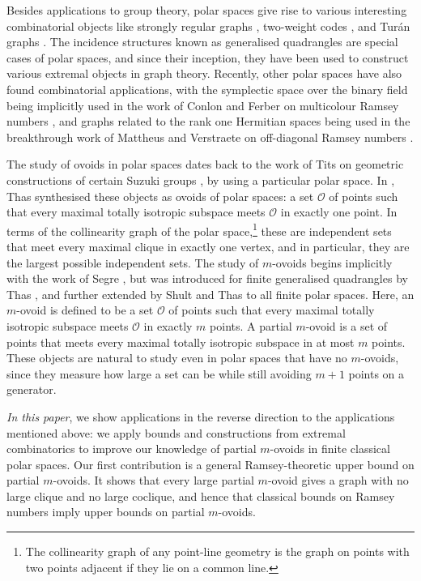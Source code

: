 \documentclass[a4paper,11pt]{amsproc}
\theoremstyle{plain}
\theoremstyle{definition}
\newcommand{\<}{\langle}
\renewcommand{\>}{\rangle} %
\begin{document}
Besides applications to group theory, polar spaces give rise to various interesting combinatorial objects like strongly regular graphs \cite{BvM}, two-weight codes \cite{CK86}, and Tur\'{a}n graphs \cite{Ball-Pepe}. 
The incidence structures known as generalised quadrangles are special cases of polar spaces, and since their inception, they have been used to construct various extremal objects in graph theory.
Recently, other polar spaces have also found combinatorial applications, with the symplectic space over the binary field being implicitly used in the work of Conlon and Ferber on multicolour Ramsey numbers \cite{CF21}, and graphs related to the rank one Hermitian spaces being used in the breakthrough work of Mattheus and Verstraete on off-diagonal Ramsey numbers \cite{MV23}. 

The study of ovoids in polar spaces dates back to the work of Tits on geometric constructions of certain Suzuki groups \cite{ThasHvM,Tits62,Tits62Suzuki}, by using a particular polar space. 
In \cite{Thas81}, Thas synthesised these objects as ovoids of polar spaces: a set $\mathcal{O}$ of points such that every maximal totally isotropic subspace meets $\mathcal{O}$ in exactly one point. 
In terms of the collinearity graph of the polar space,\footnote{The collinearity graph of any point-line geometry is the graph on points with two points adjacent if they lie on a common line.} these are independent sets that meet every maximal clique in exactly one vertex, and in particular, they are the largest possible independent sets. 
The study of $m$-ovoids begins implicitly with the work of Segre \cite{Segre65}, but was introduced for finite generalised quadrangles by Thas \cite{Thas:Interesting}, and further extended by Shult and Thas \cite{ST1996} to all finite polar spaces. 
Here, an $m$-ovoid is defined to be a set $\mathcal{O}$ of points such that every maximal totally isotropic subspace meets $\mathcal{O}$ in exactly $m$ points. 
A partial $m$-ovoid is a set of points that meets every maximal totally isotropic subspace in at most $m$ points. 
These objects are natural to study even in polar spaces that have no $m$-ovoids, since they measure how large a set can be while still avoiding $m+1$ points on a generator.

\textit{In this paper}, we show applications in the reverse direction to the applications mentioned above: we apply bounds and constructions from extremal combinatorics to improve our knowledge of partial $m$-ovoids in finite classical polar spaces. 
Our first contribution is a general Ramsey-theoretic upper bound on partial $m$-ovoids. 
It shows that every large partial $m$-ovoid gives a graph with no large clique and no large coclique, and hence that classical bounds on Ramsey numbers imply upper bounds on partial $m$-ovoids.
\end{document}
